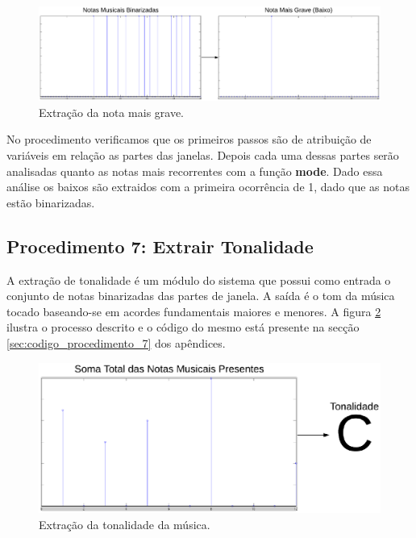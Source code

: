 \begin{figure}[h] 
  \centering
    \includegraphics[keepaspectratio=true, scale=0.55]{figuras/procedimento_6}
    \caption{Extração da nota mais grave.}
    \label{fig:procedimento_6}
\end{figure}

No procedimento verificamos que os primeiros passos são de atribuição de variáveis em relação as partes das janelas. Depois cada uma dessas partes serão analisadas quanto as notas mais recorrentes com a função \textbf{mode}. Dado essa análise os baixos são extraidos com a primeira ocorrência de 1, dado que as notas estão binarizadas.

\subsection{Procedimento 7: Extrair Tonalidade}
\label{subsec:procedimento_7}

A extração de tonalidade é um módulo do sistema que possui como entrada o conjunto de notas binarizadas das partes de janela. A saída é o tom da música tocado baseando-se em acordes fundamentais maiores e menores. A figura \ref{fig:procedimento_7} ilustra o processo descrito e o código do mesmo está presente na secção \ref{sec:codigo_procedimento_7} dos apêndices. 

\begin{figure}[h] 
  \centering
    \includegraphics[keepaspectratio=true, scale=0.55]{figuras/procedimento_7}
    \caption{Extração da tonalidade da música.}
    \label{fig:procedimento_7}
\end{figure}

